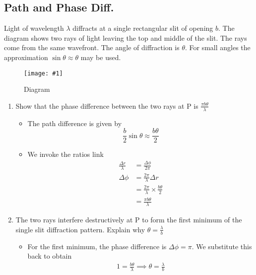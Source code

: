 \documentclass[a4paper,12pt]{article}
\newcommand{\img}[4]{\begin{center}
  \begin{figure}[H]
    \centering
    \texttt{[image: \#1]}
    \caption{#3}
    \label{fig:#4}
  \end{figure}
\end{center}}
\begin{document}
\pagebreak

\subsection{Path and Phase Diff.}


Light of wavelength $\lambda$ diffracts at a single rectangular slit of opening $b$. The diagram shows two rays of light leaving the top and middle of the slit. The rays come from the same wavefront. The angle of diffraction is $\theta$. For small angles the
approximation $\sin\theta \approx \theta$ may be used.

\img{ex/11.png}{0.9}{Diagram}{ex11}


\begin{enumerate}[label=(\alph*)]
  \item Show that the phase difference between the two rays at P is $\frac{\pi b \theta}{\lambda}$
        \begin{itemize}
          \item The path difference is given by $$\frac{b}{2}\sin\theta \approx \frac{b\theta}{2}$$
          \item We invoke the ratios link \begin{align*}
                  \frac{\Delta r}{\lambda} & = \frac{\Delta \phi}{2\pi}                     \\
                  \Delta \phi              & = \frac{2\pi}{\lambda}\Delta r                 \\
                                           & = \frac{2\pi}{\lambda}\times \frac{b\theta}{2} \\
                                           & = \frac{\pi b \theta}{\lambda}
                \end{align*}
        \end{itemize}
  \item The two rays interfere destructively at P to form the first
        minimum of the single slit diffraction pattern. Explain why $\theta =\frac{\lambda}{b}$
        \begin{itemize}
          \item For the first minimum, the phase difference is $\Delta \phi = \pi$. We substitute this back to obtain
                \begin{align*}
                  1 = \frac{b \theta}{\lambda} \implies \theta = \frac{\lambda}{b} \\
                \end{align*}
        \end{itemize}
\end{enumerate}
\end{document}
